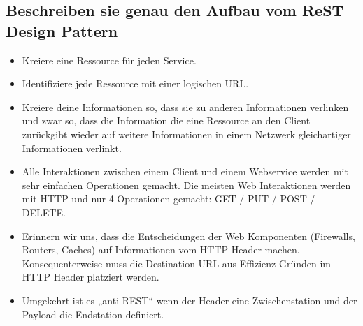 \subsection{Beschreiben sie genau den Aufbau vom ReST Design Pattern}
\begin{itemize}
	\item Kreiere eine Ressource für jeden Service.
	\item Identifiziere jede Ressource mit einer logischen URL.
	\item Kreiere deine Informationen so, dass sie zu anderen Informationen verlinken und zwar so, dass die Information die eine Ressource an den Client zurückgibt wieder auf weitere Informationen in einem Netzwerk gleichartiger Informationen verlinkt.
	\item Alle Interaktionen zwischen einem Client und einem Webservice werden mit sehr einfachen Operationen gemacht. Die meisten Web Interaktionen werden mit HTTP und nur 4 Operationen gemacht: GET / PUT / POST / DELETE.
	\item Erinnern wir uns, dass die Entscheidungen der Web Komponenten (Firewalls, Routers, Caches) auf Informationen vom HTTP Header machen. Konsequenterweise muss die Destination-URL aus Effizienz Gründen im HTTP Header platziert werden.
	\item Umgekehrt ist es „anti-REST“ wenn der Header eine Zwischenstation und der Payload die Endstation definiert.
\end{itemize}
